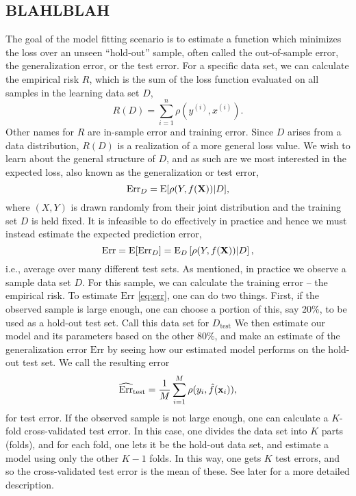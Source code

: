 \subsection{BLAHLBLAH}
The goal of the model fitting scenario is to estimate a function which minimizes the loss over an unseen ``hold-out'' sample, often called the out-of-sample error, the generalization error, or the test error. For a specific data set, we can calculate the empirical risk $R$, which is the sum of the loss function evaluated on all samples in the learning data set $D$,
\begin{equation}\label{eq:empirical-risk-2}
    R(D)=\sum_{i=1}^n\rho(y^{(i)},x^{(i)}).
\end{equation}
Other names for $R$ are in-sample error and training error. Since $D$ arises from a data distribution, $R(D)$ is a realization of a more general loss value. We wish to learn about the general structure of $D$, and as such are we most interested in the expected loss, also known as the generalization or test error,
\begin{equation*}
    \text{Err}_{D}=\operatorname{E}[\rho(Y,f(\mathbf{X}))|D],
\end{equation*}
where $(X,Y)$ is drawn randomly from their joint distribution and the training set $D$ is held fixed. It is infeasible to do effectively in practice
and hence we must instead estimate the expected prediction error,
\begin{equation}\label{eq:err}
    \text{Err}=\operatorname{E}[\text{Err}_D]=\operatorname{E}_D\left[\rho(Y,f(\mathbf{X}))|D\right],
\end{equation}
i.e., average over many different test sets. As mentioned, in practice we observe a sample data set $D$. For this sample, we can calculate the training error -- the empirical risk. To estimate $\text{Err}$ \eqref{eq:err}, one can do two things. First, if the observed sample is large enough, one can choose a portion of this, say 20\%, to be used as a hold-out test set. Call this data set for $D_{\text{test}}$ We then estimate our model and its parameters based on the other 80\%, and make an estimate of the generalization error $\text{Err}$ by seeing how our estimated model performs on the hold-out test set. We call the resulting error
\begin{equation*}
    \widehat{\text{Err}}_{\text{test}}=\frac{1}{M}\sum_{i=1}^M \rho(y_i,\hat{f}(\mathbf{x}_i)),
\end{equation*}
for test error. If the observed sample is not large enough, one can calculate a $K$-fold cross-validated test error. In this case, one divides the data set into $K$ parts (folds), and for each fold, one lets it be the hold-out data set, and estimate a model using only the other $K-1$ folds. In this way, one gets $K$ test errors, and so the cross-validated test error is the mean of these. See later for a more detailed description.

